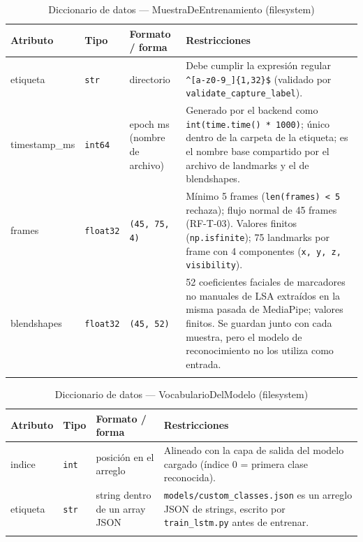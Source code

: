\begin{longtable}{p{2.8cm} p{2.2cm} p{3.2cm} p{5.6cm}}
    \toprule
    \textbf{Atributo} & \textbf{Tipo} & \textbf{Formato / forma} & \textbf{Restricciones} \\
    \midrule
    \endhead
    etiqueta & \texttt{str} & directorio & Debe cumplir la expresión regular
    \texttt{\textasciicircum{}[a-z0-9\_]\{1,32\}\$} (validado por
    \texttt{validate\_capture\_label}). \\

    timestamp\_ms & \texttt{int64} & epoch ms (nombre de archivo) &
    Generado por el backend como \texttt{int(time.time() * 1000)}; único
    dentro de la carpeta de la etiqueta; es el nombre base compartido por
    el archivo de landmarks y el de blendshapes. \\

    frames & \texttt{float32} & \texttt{(45, 75, 4)} & Mínimo 5 frames
    (\texttt{len(frames) < 5} rechaza); flujo normal de 45 frames (RF-T-03).
    Valores finitos (\texttt{np.isfinite}); 75 landmarks por frame
    con 4 componentes (\texttt{x, y, z, visibility}). \\

    blendshapes & \texttt{float32} & \texttt{(45, 52)} &
    52 coeficientes faciales de marcadores no manuales de LSA extraídos en la
    misma pasada de MediaPipe; valores finitos. Se guardan junto con cada
    muestra, pero el modelo de reconocimiento no los utiliza como entrada. \\
    \bottomrule
    \caption{Diccionario de datos — MuestraDeEntrenamiento (filesystem)}
    \label{tab:dat-dic-muestra}
\end{longtable}

\begin{longtable}{p{2.8cm} p{2.2cm} p{3.2cm} p{5.6cm}}
    \toprule
    \textbf{Atributo} & \textbf{Tipo} & \textbf{Formato / forma} & \textbf{Restricciones} \\
    \midrule
    \endhead
    indice & \texttt{int} & posición en el arreglo & Alineado con la capa de
    salida del modelo cargado (índice 0 = primera clase reconocida). \\

    etiqueta & \texttt{str} & string dentro de un array JSON &
    \texttt{models/custom\_classes.json} es un arreglo JSON de strings,
    escrito por \texttt{train\_lstm.py} antes de entrenar. \\
    \bottomrule
    \caption{Diccionario de datos — VocabularioDelModelo (filesystem)}
    \label{tab:dat-dic-vocabulario}
\end{longtable}

